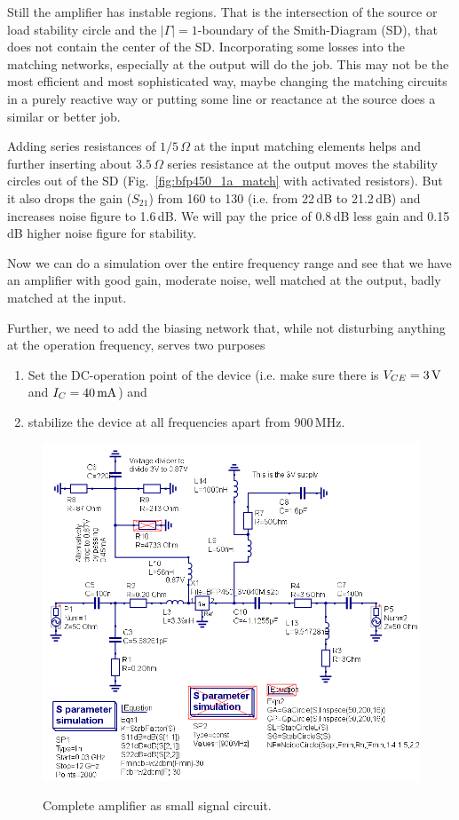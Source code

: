 
Still the amplifier has instable regions. That is the intersection of
the source or load stability circle and the $|\Gamma|=1$-boundary of
the Smith-Diagram (SD), that does not contain the center of the
SD. Incorporating some losses into the matching networks, especially
at the output will do the job. This may not be the most efficient and
most sophisticated way, maybe changing the matching circuits in a
purely reactive way or putting some line or reactance at the source
does a similar or better job.

Adding series resistances of $1/5\,\Omega$ at the input matching
elements helps and further inserting about $3.5\,\Omega$ series
resistance at the output moves the stability circles out of the SD
(Fig.~\ref{fig:bfp450_1a_match} with activated resistors).  But it
also drops the gain ($S_{21}$) from 160 to 130 (i.e. from 22\,dB to
21.2\,dB) and increases noise figure to 1.6\,dB. We will pay the price
of 0.8\,dB less gain and 0.15\,dB higher noise figure for stability.

Now we can do a simulation over the entire frequency range and see
that we have an amplifier with good gain, moderate noise, well matched
at the output, badly matched at the input.


Further, we need to add the biasing network that, while not disturbing
anything at the operation frequency, serves two purposes
\begin{enumerate}
\item Set the DC-operation point of the device (i.e. make sure there
  is $V_{CE}=3\,\mathrm{V}$ and $I_C=40\,\mathrm{mA}$) and
\item stabilize the device at all frequencies apart from 900\,MHz.
\end{enumerate}

\begin{figure}
  \centering
  {\includegraphics[width=12cm]{bfp450_2_sch.png}}
  \caption{Complete amplifier as small signal circuit.}
  \label{fig:bfp450_2_sch}
\end{figure}

